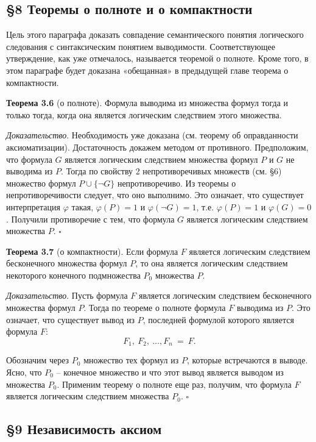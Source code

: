 \documentclass[a4paper]{article}
\begin{document}
\subsection{\S8 Теоремы о полноте и о компактности}


Цель этого параграфа доказать совпадение семантического понятия логического следования с синтаксическим понятием выводимости. Соответствующее утверждение, как уже отмечалось, называется теоремой о полноте. Кроме того, в этом параграфе будет доказана «обещанная» в предыдущей главе теорема о компактности.


\textbf{Теорема 3.6} (о полноте). Формула выводима из множества формул тогда и только тогда, когда она является логическим следствием этого множества.

\textit{Доказательство}. Необходимость уже доказана (см. теорему об оправданности аксиоматизации). Достаточность докажем методом от противного. Предположим, что формула $G$ является логическим следствием множества формул $P$ и $G$ не выводима из $P$. Тогда по свойству 2 непротиворечивых множеств (см. \S6) множество формул $P \cup \{\neg G\}$ непротиворечиво. Из теоремы о непротиворечивости следует, что оно выполнимо. Это означает, что существует интерпретация $\varphi$ такая, $\varphi (P) = 1$ и $\varphi (\neg G) = 1$, т.е. $\varphi (P) = 1$ и $\varphi(G) = 0$. Получили противоречие с тем, что формула $G$ является логическим следствием множества $P$. $\square$


\textbf{Теорема 3.7} (о компактности). Если формула $F$ является логическим следствием бесконечного множества формул $P$, то она является логическим следствием некоторого конечного подмножества $P_0$ множества $P$.

\textit{Доказательство}. Пусть формула $F$ является логическим следствием бесконечного множества формул $P$. Тогда по теореме о полноте формула $F$ выводима из $P$. Это означает, что существует вывод из $P$, последней формулой которого является формула $F$:
$$
F_1,\ F_2,\ \dots, F_n\ =\ F.
$$

Обозначим через $P_0$ множество тех формул из $P$, которые встречаются в выводе. Ясно, что $P_0$ – конечное множество и что этот вывод является выводом из множества $P_0$. Применим теорему о полноте еще раз, получим, что формула $F$ является логическим следствием множества $P_0$. $\square$

\subsection{\S 9 Независимость аксиом}
\end{document}
